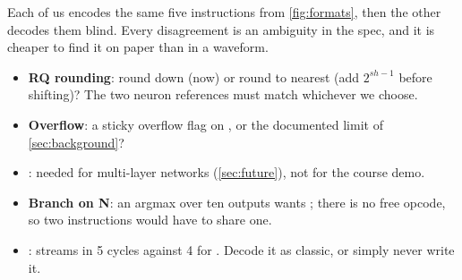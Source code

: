 \begin{aside}
Each of us encodes the same five instructions from \cref{fig:formats}, then the other decodes them blind. Every disagreement is an ambiguity in the spec, and it is cheaper to find it on paper than in a waveform.
\end{aside}

\begin{openq}
\begin{itemize}
\item \textbf{RQ rounding}: round down (now) or round to nearest (add $2^{sh-1}$ before shifting)? The two neuron references must match whichever we choose.
\item \textbf{Overflow}: a sticky overflow flag on , or the documented limit of \cref{sec:background}?
\item \textbf{}: needed for multi-layer networks (\cref{sec:future}), not for the course demo.
\item \textbf{Branch on N}: an argmax over ten outputs wants ; there is no free opcode, so two instructions would have to share one.
\item \textbf{}: streams in 5 cycles against 4 for . Decode it as classic, or simply never write it.
\end{itemize}
\end{openq}
